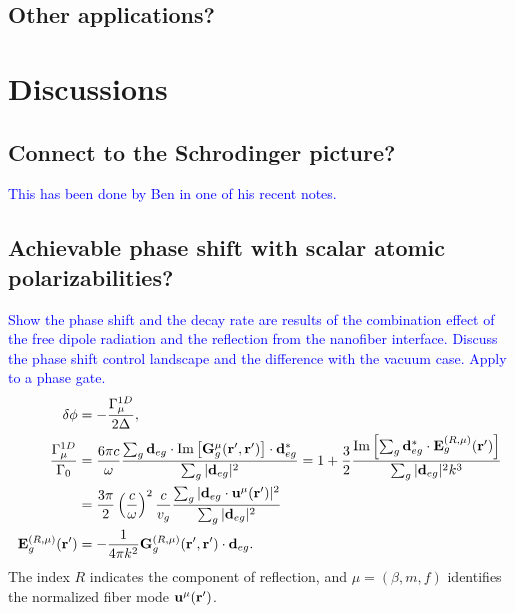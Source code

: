 \documentclass[preprint,aps,pra,onecolumn]{revtex4-1} %
\begin{document}

\subsection{Other applications?} 


\section{Discussions}



\subsection{Connect to the Schrodinger picture?}
\textcolor{blue}{This has been done by Ben in one of his recent notes. }




\subsection{Achievable phase shift with scalar atomic polarizabilities?}
\textcolor{blue}{Show the phase shift and the decay rate are results of the combination effect of the free dipole radiation and the reflection from the nanofiber interface. Discuss the phase shift control landscape and the difference with the vacuum case. Apply to a phase gate.}
\begin{align}
\delta\phi &= -\frac{\Gamma^{1D}_\mu}{2\Delta},\\
\frac{\Gamma^{1D}_\mu}{\Gamma_0} &= \frac{6\pi c}{\omega}\frac{\sum_g\mathbf{d}_{eg}\cdot \mathrm{Im}\left[\mathbf{G}_g^\mu(\mathbf{r}',\mathbf{r}') \right]\cdot\mathbf{d}_{eg}^* }{\sum_g|\mathbf{d}_{eg}|^2} = 1+ \frac{3}{2} \frac{\mathrm{Im}\left[\sum_g\mathbf{d}_{eg}^*\cdot \mathbf{E}^{(R,\mu)}_g(\mathbf{r}') \right]}{\sum_g|\mathbf{d}_{eg}|^2 k^3}\nonumber\\
&=\frac{3\pi}{2}\left(\frac{c}{\omega}\right)^2\frac{c}{v_g} \frac{\sum_{g}|\mathbf{d}_{eg}\cdot \mathbf{u}^\mu(\mathbf{r}')|^2}{\sum_g|\mathbf{d}_{eg}|^2}\\
\mathbf{E}^{(R,\mu)}_g(\mathbf{r}') &= -\frac{1}{4\pi k^2} \mathbf{G}^{(R,\mu)}_g(\mathbf{r}',\mathbf{r}')\cdot \mathbf{d}_{eg}.
\end{align}
The index $ R $ indicates the component of reflection, and $\mu=(\beta,m,f)  $ identifies the normalized fiber mode $ \mathbf{u}^\mu(\mathbf{r}') $. 
\end{document}
